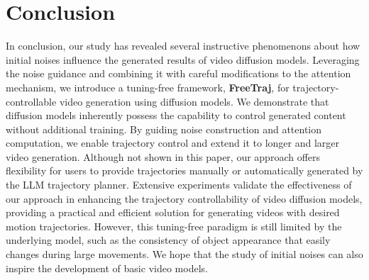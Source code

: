 \section{Conclusion}
\label{conclusion}
\vspace{-0.5em}

In conclusion, our study has revealed several instructive phenomenons about how initial noises influence the generated results of video diffusion models. Leveraging the noise guidance and combining it with careful modifications to the attention mechanism, we introduce a tuning-free framework, \textbf{FreeTraj}, for trajectory-controllable video generation using diffusion models. We demonstrate that diffusion models inherently possess the capability to control generated content without additional training. By guiding noise construction and attention computation, we enable trajectory control and extend it to longer and larger video generation. Although not shown in this paper, our approach offers flexibility for users to provide trajectories manually or automatically generated by the LLM trajectory planner. Extensive experiments validate the effectiveness of our approach in enhancing the trajectory controllability of video diffusion models, providing a practical and efficient solution for generating videos with desired motion trajectories. 
%
However, this tuning-free paradigm is still limited by the underlying model, such as the consistency of object appearance that easily changes during large movements. We hope that the study of initial noises can also inspire the development of basic video models.
